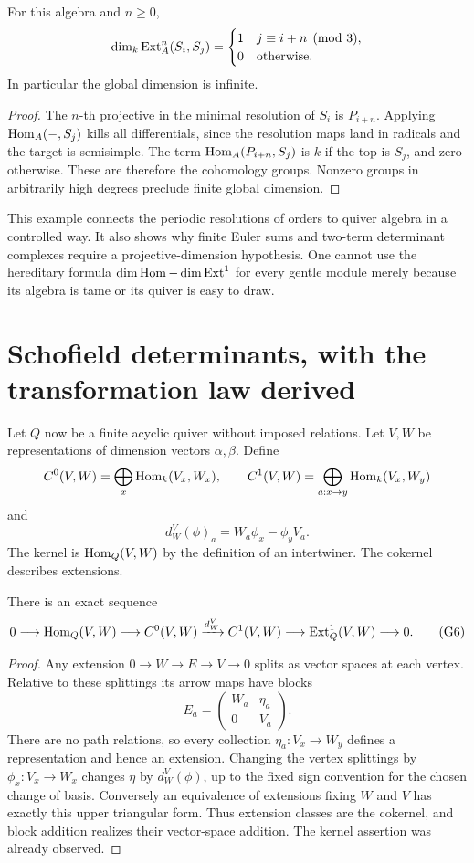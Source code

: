\begin{proposition}
For this algebra and \(n\ge0\),
\[
 \dim_k\operatorname{Ext}^n_A(S_i,S_j)
   =\begin{cases}1&j\equiv i+n\pmod3,\\0&\text{otherwise}.\end{cases}
\]
In particular the global dimension is infinite.
\end{proposition}
\begin{proof}
The \(n\)-th projective in the minimal resolution of \(S_i\) is \(P_{i+n}\). Applying \(\operatorname{Hom}_A(-,S_j)\) kills all differentials, since the resolution maps land in radicals and the target is semisimple. The term \(\operatorname{Hom}_A(P_{i+n},S_j)\) is \(k\) if the top is \(S_j\), and zero otherwise. These are therefore the cohomology groups. Nonzero groups in arbitrarily high degrees preclude finite global dimension.
\end{proof}
This example connects the periodic resolutions of orders to quiver algebra in a controlled way. It also shows why finite Euler sums and two-term determinant complexes require a projective-dimension hypothesis. One cannot use the hereditary formula \(\dim\operatorname{Hom}-\dim\operatorname{Ext}^1\) for every gentle module merely because its algebra is tame or its quiver is easy to draw.

\section{Schofield determinants, with the transformation law derived}
Let \(Q\) now be a finite acyclic quiver without imposed relations. Let \(V,W\) be representations of dimension vectors \(\alpha,\beta\). Define
\[
 C^0(V,W)=\bigoplus_x\operatorname{Hom}_k(V_x,W_x),\qquad
 C^1(V,W)=\bigoplus_{a:x\to y}\operatorname{Hom}_k(V_x,W_y)
\]
and
\[
 d_W^V(\phi)_a=W_a\phi_x-\phi_yV_a.
 \tag{G5}
\]
The kernel is \(\operatorname{Hom}_Q(V,W)\) by the definition of an intertwiner. The cokernel describes extensions.

\begin{proposition}
There is an exact sequence
\[
 0\longrightarrow\operatorname{Hom}_Q(V,W)\longrightarrow C^0(V,W)
 \xrightarrow{d_W^V} C^1(V,W)
 \longrightarrow\operatorname{Ext}^1_Q(V,W)\longrightarrow0.
 \tag{G6}\label{eq:schofield-exact}
\]
\end{proposition}
\begin{proof}
Any extension \(0\to W\to E\to V\to0\) splits as vector spaces at each vertex. Relative to these splittings its arrow maps have blocks
\[
 E_a=\begin{pmatrix}W_a&\eta_a\\0&V_a\end{pmatrix}.
\]
There are no path relations, so every collection \(\eta_a:V_x\to W_y\) defines a representation and hence an extension. Changing the vertex splittings by \(\phi_x:V_x\to W_x\) changes \(\eta\) by \(d_W^V(\phi)\), up to the fixed sign convention for the chosen change of basis. Conversely an equivalence of extensions fixing \(W\) and \(V\) has exactly this upper triangular form. Thus extension classes are the cokernel, and block addition realizes their vector-space addition. The kernel assertion was already observed.
\end{proof}

